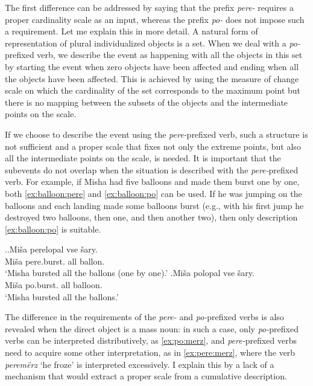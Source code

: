The first difference can be addressed by saying that the prefix \textit{pere-} requires a proper cardinality scale as an input, whereas the prefix \textit{po-} does not impose such a requirement. Let me explain this in more detail. A natural form of representation of plural individualized objects is a set. When we deal with a \textit{po-}prefixed verb, we describe the event as happening with all the objects in this set by starting the event when zero objects have been affected and ending when all the objects have been affected. This is achieved by using the measure of change scale on which the cardinality of the set corresponds to the maximum point but there is no mapping between the subsets of the objects and the intermediate points on the scale.

If we choose to describe the event using the \textit{pere-}prefixed verb, such a structure is not sufficient and a proper scale that fixes not only the extreme points, but also all the intermediate points on the scale, is needed. It is important that the subevents do not overlap when the situation is described with the \textit{pere-}prefixed verb. For example, if Misha had five balloons and made them burst one by one, both \ref{ex:balloon:pere} and \ref{ex:balloon:po} can be used. If he was jumping on the balloons and each landing made some balloons burst (e.g., with his first jump he destroyed two balloons, then one, and then another two), then only description \ref{ex:balloon:po} is suitable.

\ex.\ag.\label{ex:balloon:pere}Mi\v{s}a perelopal vse \v{s}ary.\\
Mi\v{s}a pere.burst. all ballon.\\
\trans `Misha bursted all the ballons (one by one).'
\bg.\label{ex:balloon:po}Mi\v{s}a polopal vse \v{s}ary.\\
Mi\v{s}a po.burst. all balloon.\\
\trans `Misha bursted all the ballons.'

The difference in the requirements of the \textit{pere-} and \textit{po-}prefixed verbs is also revealed when the direct object is a mass noun: in such a case, only \textit{po-}prefixed verbs can be interpreted distributively, as \ref{ex:po:merz}, and \textit{pere-}prefixed verbs need to acquire some other interpretation, as in \ref{ex:pere:merz}, where the verb \textit{perem\"{e}rz} `he froze' is interpreted excessively. I explain this by a lack of a mechanism that would extract a proper scale from a cumulative description.

